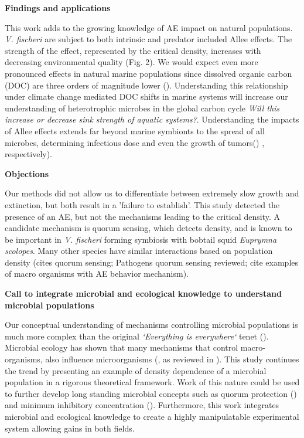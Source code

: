 \documentclass[a4paper,10pt]{article}\usepackage[]{graphicx}\usepackage[]{color}
\begin{document}
\textbf{Findings and applications}

This work adds to the growing knowledge of AE impact on natural populations. \textit{V. fischeri} are subject to both intrinsic and predator included Allee effects. The strength of the effect, represented by the critical density, increases with decreasing environmental quality (Fig. 2). We would expect even more pronounced effects in natural marine populations since dissolved organic carbon (DOC) are three orders of magnitude lower (\cite{pedler_single_2014}).  Understanding this relationship under climate change mediated DOC shifts in marine systems will increase our understanding of heterotrophic microbes in the global carbon cycle \textit{Will this increase or decrease sink strength of aquatic systems?}.  Understanding the impacts of Allee effects extends far beyond marine symbionts to the spread of all microbes, determining infectious dose and even the growth of tumors() \cite{regoes_dose-dependent_2002,litchman_invisible_2010, korolev_turning_2014}, respectively).
	
\textbf{Objections}

Our methods did not allow us to differentiate between extremely slow growth and extinction, but both result in a 'failure to establish'. This study detected the presence of an AE, but not the mechanisms leading to the critical density. A candidate mechanism is quorum sensing, which detects density, and is known to be important in \textit{V. fischeri} forming symbiosis with bobtail squid \textit{Euprymna scolopes}. Many other species have similar interactions based on population density (\cite{waters_quorum_2005,de_kievit_bacterial_2000, gascoigne_allee_2004}cites quorum sensing; Pathogens quorum sensing reviewed; cite examples of macro organisms with AE behavior mechanism). 
  
\textbf{Call to integrate microbial and ecological knowledge to understand microbial populations}

Our conceptual understanding of mechanisms controlling microbial populations is much more complex than the original \textit{`Everything is everywhere`} tenet (\cite{baas_becking_geobiologie_1934}). Microbial ecology has shown that many mechanisms that control macro-organisms, also influence microorganisms (\cite{reno_biogeography_2009, hellweger_biogeographic_2014}, as reviewed in \cite{prosser_role_2007}). This study continues the trend by presenting an example of density dependence of a microbial population in a rigorous theoretical framework. Work of this nature could be used to further develop long standing microbial concepts such as quorum protection (\cite{macreadie_quorum_2015}) and minimum inhibitory concentration (\cite{steels_sorbic_2000, galgiani_turbidimetric_1978}). Furthermore, this work integrates microbial and ecological knowledge to create a highly manipulatable experimental system allowing gains in both fields.  
\end{document}
